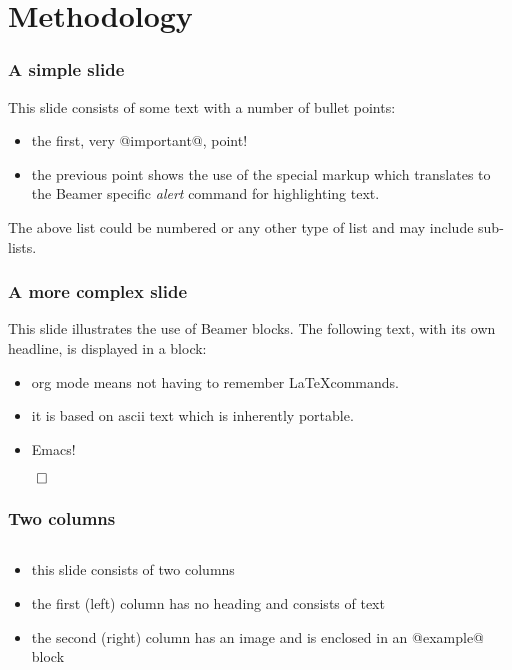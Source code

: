\documentclass[bigger, english, 10pt, presentation]{beamer}
\begin{document}
\section{Methodology}
\label{sec-2}
\begin{frame}
\frametitle{A simple slide}
\label{sec-2-1}

This slide consists of some text with a number of bullet points:
\begin{itemize}
\item the first, very @important@, point!
\item the previous point shows the use of the special markup which
  translates to the Beamer specific \emph{alert} command for highlighting
  text.
\end{itemize}
The above list could be numbered or any other type of list and may
include sub-lists.
\end{frame}
\begin{frame}
\frametitle{A more complex slide}
\label{sec-2-2}

This slide illustrates the use of Beamer blocks.  The following text,
with its own headline, is displayed in a block:
\begin{theorem}
\label{sec-2-2-1}

\begin{itemize}
\item org mode means not having to remember \LaTeX commands.
\item it is based on ascii text which is inherently portable.
\item Emacs!
\end{itemize}

    \hfill \(\qed\)
\end{theorem}
\end{frame}
\begin{frame}
\frametitle{Two columns}
\label{sec-2-3}
\begin{columns}
\begin{column}{0.4\textwidth}
\label{sec-2-3-1}

\begin{itemize}
\item this slide consists of two columns
\item the first (left) column has no heading and consists of text
\item the second (right) column has an image and is enclosed in an
      @example@ block
\end{itemize}
\end{column}
\begin{column}{0.6\textwidth}
\begin{example}[A screenshot]
\label{sec-2-3-2}
\end{example}
\end{column}
\end{columns}
\end{frame}
\end{document}
